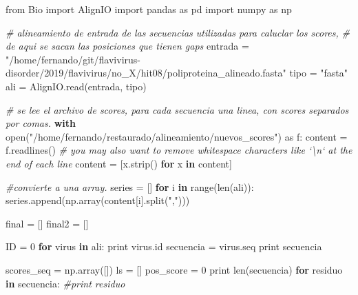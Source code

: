 \documentclass[11pt]{article}
\newenvironment{Shaded}{}{}
\newcommand{\KeywordTok}[1]{\textcolor[rgb]{0.00,0.44,0.13}{\textbf{{#1}}}}
\newcommand{\DecValTok}[1]{\textcolor[rgb]{0.25,0.63,0.44}{{#1}}}
\newcommand{\StringTok}[1]{\textcolor[rgb]{0.25,0.44,0.63}{{#1}}}
\newcommand{\CommentTok}[1]{\textcolor[rgb]{0.38,0.63,0.69}{\textit{{#1}}}}
\newcommand{\NormalTok}[1]{{#1}}
\newcommand{\ImportTok}[1]{{#1}}
\newcommand{\ControlFlowTok}[1]{\textcolor[rgb]{0.00,0.44,0.13}{\textbf{{#1}}}}
\newcommand{\OperatorTok}[1]{\textcolor[rgb]{0.40,0.40,0.40}{{#1}}}
\newcommand{\BuiltInTok}[1]{{#1}}
\begin{document}
\begin{Shaded}
\begin{Highlighting}[]
\ImportTok{from}\NormalTok{ Bio }\ImportTok{import}\NormalTok{ AlignIO}
\ImportTok{import}\NormalTok{ pandas }\ImportTok{as}\NormalTok{ pd}
\ImportTok{import}\NormalTok{ numpy }\ImportTok{as}\NormalTok{ np}

\CommentTok{# alineamiento de entrada de las secuencias utilizadas para caluclar los scores,}
\CommentTok{# de aqui se sacan las posiciones que tienen gaps}
\NormalTok{entrada }\OperatorTok{=} \StringTok{"/home/fernando/git/flavivirus-disorder/2019/flavivirus/no_X/hit08/poliproteina_alineado.fasta"}
\NormalTok{tipo }\OperatorTok{=} \StringTok{"fasta"}
\NormalTok{ali }\OperatorTok{=}\NormalTok{ AlignIO.read(entrada, tipo)}

\CommentTok{# se lee el archivo de scores, para cada secuencia una linea, con scores separados por comas.}
\ControlFlowTok{with} \BuiltInTok{open}\NormalTok{(}\StringTok{"/home/fernando/restaurado/alineamiento/nuevos_scores"}\NormalTok{) }\ImportTok{as}\NormalTok{ f:}
\NormalTok{    content }\OperatorTok{=}\NormalTok{ f.readlines()}
\CommentTok{# you may also want to remove whitespace characters like `\textbackslash{}n` at the end of each line}
\NormalTok{content }\OperatorTok{=}\NormalTok{ [x.strip() }\ControlFlowTok{for}\NormalTok{ x }\KeywordTok{in}\NormalTok{ content]}

\CommentTok{#convierte a una array.}
\NormalTok{series }\OperatorTok{=}\NormalTok{ []}
\ControlFlowTok{for}\NormalTok{ i }\KeywordTok{in} \BuiltInTok{range}\NormalTok{(}\BuiltInTok{len}\NormalTok{(ali)):}
\NormalTok{    series.append(np.array(content[i].split(}\StringTok{","}\NormalTok{)))}

\NormalTok{final }\OperatorTok{=}\NormalTok{ []}
\NormalTok{final2 }\OperatorTok{=}\NormalTok{ []}

\NormalTok{ID }\OperatorTok{=} \DecValTok{0}
\ControlFlowTok{for}\NormalTok{ virus }\KeywordTok{in}\NormalTok{ ali:}
    \BuiltInTok{print}\NormalTok{ virus.}\BuiltInTok{id}
\NormalTok{    secuencia }\OperatorTok{=}\NormalTok{ virus.seq}
    \BuiltInTok{print}\NormalTok{ secuencia}

\NormalTok{    scores_seq }\OperatorTok{=}\NormalTok{ np.array([])}
\NormalTok{    ls }\OperatorTok{=}\NormalTok{ []}
\NormalTok{    pos_score }\OperatorTok{=} \DecValTok{0}
    \BuiltInTok{print} \BuiltInTok{len}\NormalTok{(secuencia)}
    \ControlFlowTok{for}\NormalTok{ residuo }\KeywordTok{in}\NormalTok{ secuencia:}
        \CommentTok{#print residuo}


\end{Highlighting}
\end{Shaded}
\end{document}
